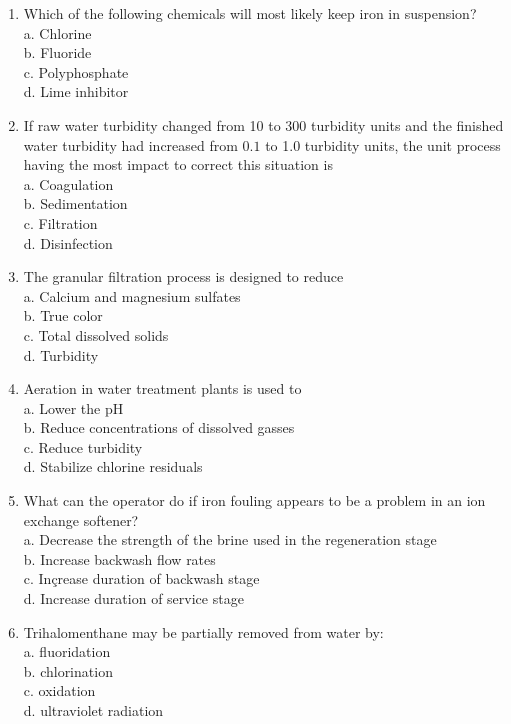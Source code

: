 \begin{enumerate}
\item Which of the following chemicals will most likely keep iron in suspension?\\
a. Chlorine\\
b. Fluoride\\
c. Polyphosphate\\
d. Lime inhibitor

\item If raw water turbidity changed from 10 to 300 turbidity units and the finished water turbidity had increased from $0.1$ to 1.0 turbidity units, the unit process having the most impact to correct this situation is\\
a. Coagulation\\
b. Sedimentation\\
c. Filtration\\
d. Disinfection

\item The granular filtration process is designed to reduce\\
a. Calcium and magnesium sulfates\\
b. True color\\
c. Total dissolved solids\\
d. Turbidity\item Aeration in water treatment plants is used to\\
a. Lower the $\mathrm{pH}$\\
b. Reduce concentrations of dissolved gasses\\
c. Reduce turbidity\\
d. Stabilize chlorine residuals\\

\item What can the operator do if iron fouling appears to be a problem in an ion exchange softener?\\
a. Decrease the strength of the brine used in the regeneration stage\\
b. Increase backwash flow rates\\
c. Inçrease duration of backwash stage\\
d. Increase duration of service stage\\

\item Trihalomenthane may be partially removed from water by:\\
a. fluoridation\\
b. chlorination\\
c. oxidation\\
d. ultraviolet radiation\\


\end{enumerate}
